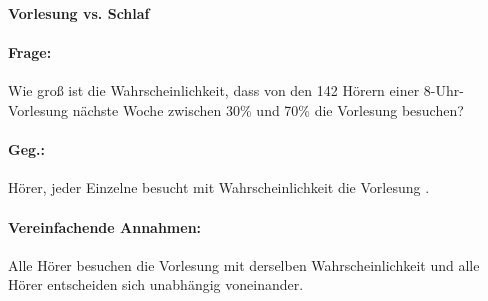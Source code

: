 \begin{bsp}
    \textbf{Vorlesung vs. Schlaf}  \\

    \paragraph{Frage:} Wie groß ist die Wahrscheinlichkeit, dass von den 142 Hörern einer 8-Uhr-Vorlesung nächste Woche zwischen 30\% und 70\% die Vorlesung besuchen?

    \paragraph{Geg.:}  Hörer, jeder Einzelne besucht mit Wahrscheinlichkeit  die Vorlesung .

    \paragraph{Vereinfachende Annahmen:}
    Alle Hörer besuchen die Vorlesung mit derselben Wahrscheinlichkeit und alle Hörer entscheiden sich unabhängig
    voneinander.


\end{bsp}
